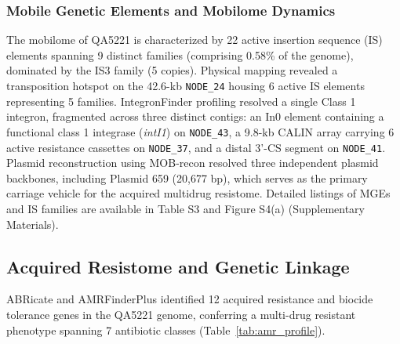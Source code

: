 \documentclass[pdflatex,sn-mathphys-num]{sn-jnl}
\begin{document}
\subsubsection{Mobile Genetic Elements and Mobilome Dynamics}
The mobilome of QA5221 is characterized by 22 active insertion sequence (IS) elements spanning 9 distinct families (comprising 0.58\% of the genome), dominated by the IS3 family (5 copies). Physical mapping revealed a transposition hotspot on the 42.6-kb \texttt{NODE\_24} housing 6 active IS elements representing 5 families. IntegronFinder profiling resolved a single Class 1 integron, fragmented across three distinct contigs: an In0 element containing a functional class 1 integrase (\textit{intI1}) on \texttt{NODE\_43}, a 9.8-kb CALIN array carrying 6 active resistance cassettes on \texttt{NODE\_37}, and a distal 3'-CS segment on \texttt{NODE\_41}. Plasmid reconstruction using MOB-recon resolved three independent plasmid backbones, including Plasmid 659 (20,677 bp), which serves as the primary carriage vehicle for the acquired multidrug resistome. Detailed listings of MGEs and IS families are available in Table S3 and Figure S4(a) (Supplementary Materials).

\subsection{Acquired Resistome and Genetic Linkage}
ABRicate and AMRFinderPlus identified 12 acquired resistance and biocide tolerance genes in the QA5221 genome, conferring a multi-drug resistant phenotype spanning 7 antibiotic classes (Table~\ref{tab:amr_profile}). 
\end{document}
